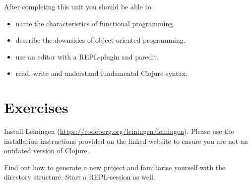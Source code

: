 \documentclass[11pt,a4paper]{article}
\begin{document}
	After completing this unit you should be able to
	
	\begin{itemize}
		\item name the characteristics of functional programming.
		\item describe the downsides of object-oriented programming.
		\item use an editor with a REPL-plugin and paredit.
        \item read, write and understand fundamental Clojure syntax.
	\end{itemize}
	
	\section{Exercises}

	\begin{exercise}[Leiningen]
		Install Leiningen (\url{https://codeberg.org/leiningen/leiningen}).
		Please use the installation instructions provided on the linked website
		to ensure you are not an outdated version of Clojure.
		
		Find out how to generate a new project
		and familiarise yourself with the directory structure.
		Start a REPL-session as well.
	\end{exercise}
	
\end{document}
